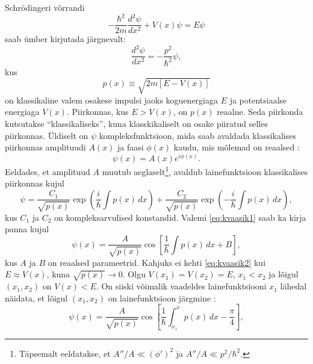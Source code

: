 \documentclass{trkut}%
\begin{document}
Schrödingeri võrrandi
\begin{equation}
    -\frac{\hbar^2}{2m}\frac{d^2\psi}{dx^2}+V(x)\psi=E\psi
\end{equation}
saab ümber kirjutada järgnevalt:
\begin{equation}
    \frac{d^2 \psi}{dx^2}= - \frac{p^2}{\hbar^2}\psi,
\end{equation}
kus
\begin{equation}
    p(x) \equiv \sqrt{2m[E-V(x)]}
\end{equation}
on klassikaline valem osakese impulsi jaoks koguenergiaga $E$ ja potentsiaalse energiaga $V(x)$.
Piirkonnas, kus $E>V(x)$, on $p(x)$ reaalne.
Seda piirkonda kutsutakse \enquote{klassikaliseks}, kuna klasskikaliselt on osake piiratud selles piirkonnas.
Üldiselt on $\psi$ kompleksfunktsioon, mida saab avaldada klassikalises piirkonnas amplituudi $A(x)$ ja faasi $\phi(x)$ kaudu, mis mõlemad on reaalsed \parencite[316]{griffiths05}:
\begin{equation}
    \psi(x)=A(x)e^{i\phi(x)}.
\end{equation}
Eeldades, et amplituud $A$ muutub aeglaselt\footnote{Täpsemalt eeldatakse, et $A''/A\ll(\phi ')^2$ ja $A''/A\ll p^2/\hbar^2$.}, avaldub lainefunktsioon klassikalises piirkonnas kujul \parencite[316-318]{griffiths05}
\begin{equation}
    \psi = \frac{C_1}{\sqrt{p(x)}}\exp\left(\frac{i}{\hbar}\int p(x)\, dx\right) +\frac{C_2}{\sqrt{p(x)}}\exp\left(-\frac{i}{\hbar}\int p(x)\, dx\right),
    \label{eq:kvaasik1}
\end{equation}
kus $C_1$ ja $C_2$ on kompleksarvulised konstandid.
Valemi \eqref{eq:kvaasik1} saab ka kirja panna kujul \parencite[446]{shankar94}
\begin{equation}
    \psi(x)=\frac{A}{\sqrt{p(x)}} \cos \left[ \frac{1}{\hbar}\int p(x)\, dx + B \right],
    \label{eq:kvaasik2}
\end{equation}
kus $A$ ja $B$ on reaalsed parameetrid.
Kahjuks ei kehti \eqref{eq:kvaasik2} kui $E \approx V(x)$, kuna $\sqrt{p(x)} \to 0$. Olgu $V(x_1)=V(x_2)=E$, $x_1<x_2$ ja lõigul $(x_1, x_2)$ on $V(x)<E$.
On siiski võimalik vaadeldes lainefunktsiooni $x_1$ lähedal näidata, et lõigul $(x_1, x_2)$ on lainefunktsioon järgmine \parencite[167-170]{landau05}:
\begin{equation}
    \psi(x)=\frac{A}{\sqrt{p(x)}} \cos \left[ \frac{1}{\hbar}\int_{x_1}^{x} p(x)\, dx - \frac{\pi}{4} \right],
\end{equation}
\end{document}
